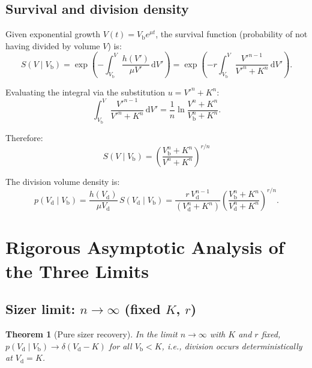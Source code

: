 \documentclass[11pt]{article}
\newcommand{\Vb}{V_{\mathrm{b}}}
\newcommand{\Vd}{V_{\mathrm{d}}}
\newcommand{\dd}{\mathrm{d}}
\newtheorem{theorem}{Theorem}
\begin{document}
\subsection{Survival and division density}

Given exponential growth $V(t) = \Vb e^{\mu t}$, the survival function (probability of not having divided by volume $V$) is:
\begin{equation}
  S(V \mid \Vb) = \exp\!\left(-\int_{\Vb}^{V} \frac{h(V')}{\mu V'}\, \dd V'\right)
  = \exp\!\left(-r \int_{\Vb}^{V} \frac{V'^{n-1}}{V'^n + K^n}\, \dd V'\right).
  \label{eq:survival}
\end{equation}

Evaluating the integral via the substitution $u = V'^n + K^n$:
\begin{equation}
  \int_{\Vb}^{V} \frac{V'^{n-1}}{V'^n + K^n}\, \dd V' = \frac{1}{n}\ln\frac{V^n + K^n}{\Vb^n + K^n}.
\end{equation}

Therefore:
\begin{equation}
  \boxed{S(V \mid \Vb) = \left(\frac{\Vb^n + K^n}{V^n + K^n}\right)^{r/n}}
  \label{eq:survival_closed}
\end{equation}

The division volume density is:
\begin{equation}
  p(\Vd \mid \Vb) = \frac{h(\Vd)}{\mu \Vd}\, S(\Vd \mid \Vb)
  = \frac{r\, \Vd^{n-1}}{(\Vd^n + K^n)}\left(\frac{\Vb^n + K^n}{\Vd^n + K^n}\right)^{r/n}.
  \label{eq:div_density}
\end{equation}

\section{Rigorous Asymptotic Analysis of the Three Limits}

\subsection{Sizer limit: $n \to \infty$ (fixed $K$, $r$)}

\begin{theorem}[Pure sizer recovery]
  In the limit $n \to \infty$ with $K$ and $r$ fixed, $p(\Vd \mid \Vb) \to \delta(\Vd - K)$ for all $\Vb < K$, i.e., division occurs deterministically at $\Vd = K$.
\end{theorem}
\end{document}
